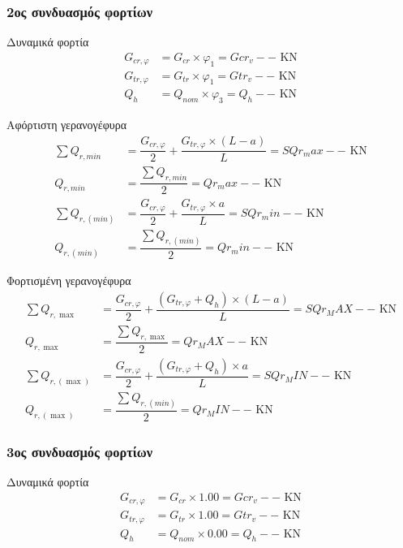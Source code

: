 \subsubsection{2ος συνδυασμός φορτίων}
Δυναμικά  φορτία
\begin{align*}
G_{cr,φ}  &= G_{cr} \times φ_1    = Gcr_v-- \text{ KN} \\
G_{tr,φ}  &= G_{tr} \times φ_1    = Gtr_v-- \text{ KN} \\
Q_h       &= Q_{nom} \times φ_3   = Q_h--   \text{ KN}
\end{align*}

Αφόρτιστη γερανογέφυρα
\begin{align*}
\sum{Q_{r,min}}   &= \dfrac{G_{cr,φ}}{2} + \dfrac{G_{tr,φ} \times (L - a)}{L} = SQr_max-- \text{ KN} \\
Q_{r,min}         &= \dfrac{\displaystyle\sum{Q_{r,min}}}{2}                  = Qr_max--  \text{ KN} \\
\sum{Q_{r,(min)}} &= \dfrac{G_{cr,φ}}{2} + \dfrac{G_{tr,φ} \times a}{L}       = SQr_min-- \text{ KN} \\
Q_{r,(min)}       &= \dfrac{\displaystyle\sum{Q_{r,(min)}}}{2}                = Qr_min--  \text{ KN}
\end{align*}

Φορτισμένη γερανογέφυρα
\begin{align*}
\sum{Q_{r,\max}}     &= \dfrac{G_{cr,φ}}{2} + \dfrac{(G_{tr,φ} + Q_h) \times (L - a)}{L}   = SQr_MAX-- \text{ KN} \\
Q_{r,\max}           &= \dfrac{\displaystyle\sum{Q_{r,\max}}}{2}                           = Qr_MAX--  \text{ KN} \\
\sum{Q_{r,(\max)}}   &= \dfrac{G_{cr,φ}}{2} + \dfrac{(G_{tr,φ} + Q_h) \times a}{L}         = SQr_MIN-- \text{ KN} \\
Q_{r,(\max)}         &= \dfrac{\displaystyle\sum{Q_{r,(min)}}}{2}                          = Qr_MIN-- \text{ KN}
\end{align*}

\subsubsection{3ος συνδυασμός φορτίων}
Δυναμικά  φορτία
\begin{align*}
G_{cr,φ}  &= G_{cr} \times 1.00    = Gcr_v-- \text{ KN} \\
G_{tr,φ}  &= G_{tr} \times 1.00    = Gtr_v-- \text{ KN} \\
Q_h       &= Q_{nom} \times 0.00   = Q_h--   \text{ KN}
\end{align*}

